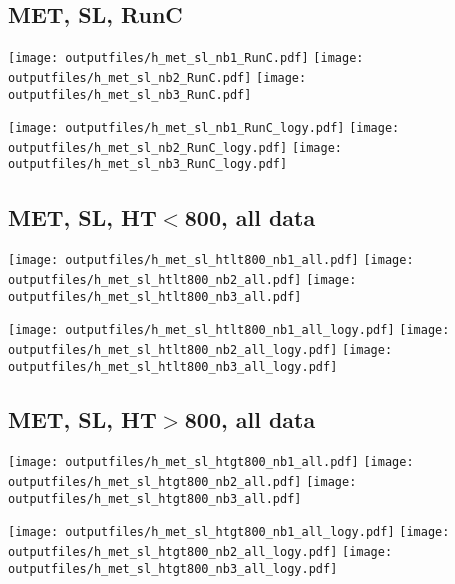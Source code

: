 \documentclass[11pt]{article}
\begin{document}
     \subsection{ MET, SL, RunC}

    \noindent
     \texttt{[image: outputfiles/h\_met\_sl\_nb1\_RunC.pdf]}
     \texttt{[image: outputfiles/h\_met\_sl\_nb2\_RunC.pdf]}
     \texttt{[image: outputfiles/h\_met\_sl\_nb3\_RunC.pdf]}

    \noindent
     \texttt{[image: outputfiles/h\_met\_sl\_nb1\_RunC\_logy.pdf]}
     \texttt{[image: outputfiles/h\_met\_sl\_nb2\_RunC\_logy.pdf]}
     \texttt{[image: outputfiles/h\_met\_sl\_nb3\_RunC\_logy.pdf]}


     \subsection{ MET, SL, HT$<$800, all data}

    \noindent
     \texttt{[image: outputfiles/h\_met\_sl\_htlt800\_nb1\_all.pdf]}
     \texttt{[image: outputfiles/h\_met\_sl\_htlt800\_nb2\_all.pdf]}
     \texttt{[image: outputfiles/h\_met\_sl\_htlt800\_nb3\_all.pdf]}

    \noindent
     \texttt{[image: outputfiles/h\_met\_sl\_htlt800\_nb1\_all\_logy.pdf]}
     \texttt{[image: outputfiles/h\_met\_sl\_htlt800\_nb2\_all\_logy.pdf]}
     \texttt{[image: outputfiles/h\_met\_sl\_htlt800\_nb3\_all\_logy.pdf]}


     \subsection{ MET, SL, HT$>$800, all data}

    \noindent
     \texttt{[image: outputfiles/h\_met\_sl\_htgt800\_nb1\_all.pdf]}
     \texttt{[image: outputfiles/h\_met\_sl\_htgt800\_nb2\_all.pdf]}
     \texttt{[image: outputfiles/h\_met\_sl\_htgt800\_nb3\_all.pdf]}

    \noindent
     \texttt{[image: outputfiles/h\_met\_sl\_htgt800\_nb1\_all\_logy.pdf]}
     \texttt{[image: outputfiles/h\_met\_sl\_htgt800\_nb2\_all\_logy.pdf]}
     \texttt{[image: outputfiles/h\_met\_sl\_htgt800\_nb3\_all\_logy.pdf]}
\end{document}
